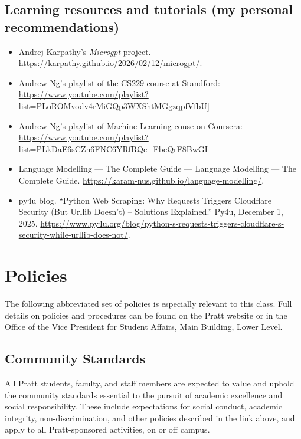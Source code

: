 \documentclass[12pt]{article}
\begin{document}
\subsection*{Learning resources and tutorials (my personal recommendations)}
\label{sec:orgab05727}
\begin{itemize}
\item Andrej Karpathy's \emph{Microgpt} project.
\url{https://karpathy.github.io/2026/02/12/microgpt/}.
\item Andrew Ng's playlist of the CS229 course at Standford:
\url{https://www.youtube.com/playlist?list=PLoROMvodv4rMiGQp3WXShtMGgzqpfVfbU}]
\item Andrew Ng's playlist of Machine Learning couse on Coursera:
\url{https://www.youtube.com/playlist?list=PLkDaE6sCZn6FNC6YRfRQc\_FbeQrF8BwGI}
\item Language Modelling — The Complete Guide — Language Modelling — The
Complete Guide. \url{https://karam-nus.github.io/language-modelling/}.
\item py4u blog. “Python Web Scraping: Why Requests Triggers Cloudflare
Security (But Urllib Doesn’t) – Solutions Explained.” Py4u, December
1, 2025.
\url{https://www.py4u.org/blog/python-s-requests-triggers-cloudflare-s-security-while-urllib-does-not/}.
\end{itemize}


\section*{Policies}
\label{sec:org325697e}

The following abbreviated set of policies is especially relevant to
this class. Full details on policies and procedures can be found on
the Pratt website or in the Office of the Vice President for Student
Affairs, Main Building, Lower Level.

\subsection*{Community Standards}
\label{sec:org9d2644b}

All Pratt students, faculty, and staff members are expected to value
and uphold the community standards essential to the pursuit of
academic excellence and social responsibility. These include
expectations for social conduct, academic integrity,
non-discrimination, and other policies described in the link above,
and apply to all Pratt-sponsored activities, on or off campus.
\end{document}

